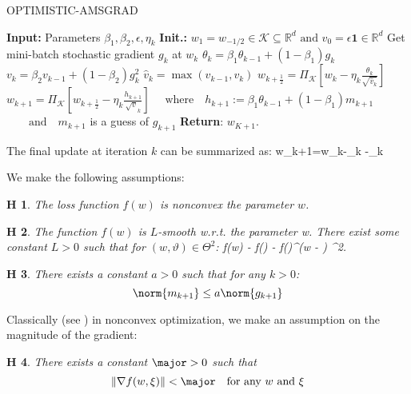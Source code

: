\documentclass[11pt]{article}
\newtheorem{assumption}{H\!\!}
\theoremstyle{k}
\begin{document}
\begin{algorithm}[H]
\caption{OPTIMISTIC-AMSGRAD}\label{alg:opt-ams}
  \begin{algorithmic}[1]
  \STATE \textbf{Input:} Parameters $\beta_{1}, \beta_{2}, \epsilon, \eta_{k}$
  \STATE \textbf{Init.:} $w_{1}=w_{-1 / 2} \in \mathcal{K} \subseteq \mathbb{R}^{d} \text { and } v_{0}=\epsilon \mathbf{1} \in \mathbb{R}^{d}$
  \STATE Get mini-batch stochastic gradient $g_{k}$ at $w_{k}$
   \STATE $\theta_{k}=\beta_{1} \theta_{k-1}+\left(1-\beta_{1}\right) g_{k}$
   \STATE $v_{k}=\beta_{2} v_{k-1}+\left(1-\beta_{2}\right) g_{k}^{2}$
   \STATE $ \hat{v}_{k}=\max \left(\hat{v}_{k-1}, v_{k}\right)$
   \STATE $ w_{k+\frac{1}{2}}=\Pi_{\mathcal{K}}\left[w_k-\eta_{k} \frac{\theta_{k}}{\sqrt{\hat{v}_{k}}}\right]$
   \STATE $ w_{k+1}=\Pi_{\mathcal{K}}\left[w_{k+\frac{1}{2}}-\eta_{k} \frac{h_{k+1}}{\sqrt{v}_{k}}\right]$
   \STATE $ \quad \text{where} \quad h_{k+1}:=\beta_{1} \theta_{k-1} + (1-\beta_{1}) m_{k+1}$
      \STATE $ \quad\quad \text{and} \quad m_{k+1}$ is a guess of $g_{k+1}$
\ENDFOR
\STATE \textbf{Return}: $w_{K+1}$.
  \end{algorithmic}
\end{algorithm}\vspace{.1cm}
The final update at iteration $k$ can be summarized as:
\beq\label{eq:finalupdate}
w_{k+1}=w_{k}-\eta_{k} -\eta_{k} 
\eeq



We make the following assumptions:
\begin{assumption}\label{ass:nonconv}
The loss function $f(w)$ is nonconvex \wrt the parameter $w$.
\end{assumption}
\begin{assumption}\label{ass:smooth}
The function $f(w)$ is $L$-smooth w.r.t. the parameter w.
There exist some constant $L > 0$ such that for $(w, \vartheta) \in \Theta^2$:
\beq
f(w) - f(\vartheta) - \nabla f(\vartheta)^\top(w - \vartheta) \leq {} ^2\eqsp.
\eeq
\end{assumption}
\begin{assumption}\label{ass:guessbound}
There exists a constant $a >0$ such that for any $k >0$:
$$
\norm{m_{k+1}} \leq a \norm{g_{k+1}}
$$
\end{assumption}
Classically (see \citep{ghadimi2013stochastic}) in nonconvex optimization, we make an assumption on the magnitude of the gradient:
\begin{assumption}\label{ass:bounded}
There exists a constant $\major >0$ such that 
$$
\|\nabla f(w, \xi)\| < \major \quad \textrm{for any $w$ and $\xi$}
$$
\end{assumption}
\end{document}
